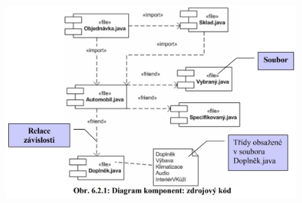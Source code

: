 \begin{figure}[H]
\centering
\includegraphics[width=.8\textwidth]{assets/diagram_komponent.jpg}
\end{figure}